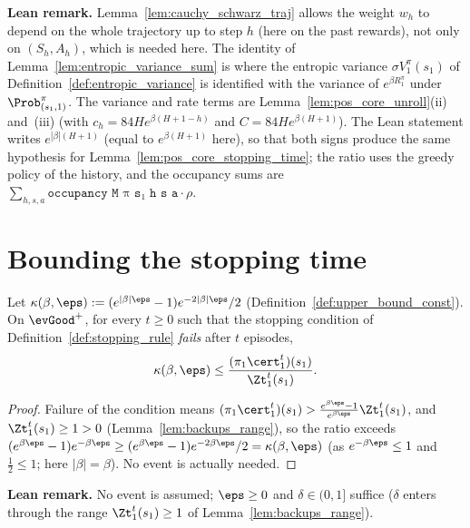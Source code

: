 \textbf{Lean remark.} Lemma~\ref{lem:cauchy_schwarz_traj} allows the weight $w_h$ to depend on
the whole trajectory up to step $h$ (here on the past rewards), not only on $(S_h, A_h)$, which
is needed here. The identity of Lemma~\ref{lem:entropic_variance_sum} is where the entropic
variance $\sigma V^\pi_1(s_1)$ of Definition~\ref{def:entropic_variance} is identified with the
variance of $e^{\beta R_1^\pi}$ under $\Prob^\pi_{(s_1,1)}$. The variance and rate terms are
Lemma~\ref{lem:pos_core_unroll}(ii) and~(iii) (with $c_h = 84He^{\beta(H+1-h)}$ and
$C = 84He^{\beta(H+1)}$). The Lean statement writes $e^{|\beta|(H+1)}$ (equal to $e^{\beta(H+1)}$ here), so
that both signs produce the same hypothesis for Lemma~\ref{lem:pos_core_stopping_time}; the
ratio uses the greedy policy of the history, and the occupancy sums are
$\sum_{h, s, a}\texttt{occupancy M π s₁ h s a} \cdot \rho$.

\section{Bounding the stopping time}
\label{sec:pos_stopping_time}

\begin{lemma}\label{lem:progress_pos}
\leanok
{}
Let $\kappa(\beta, \eps) := (e^{|\beta|\eps} - 1)e^{-2|\beta|\eps}/2$ (Definition~\ref{def:upper_bound_const}).
On $\evGood^+$, for every $t \ge 0$ such that the stopping condition of Definition~\ref{def:stopping_rule}
\emph{fails} after $t$ episodes,
\[
  \kappa(\beta, \eps) \le \frac{(\pi_1\cert_1^t)(s_1)}{\Zt_1^t(s_1)} .
\]
\end{lemma}

\begin{proof}
\leanok
Failure of the condition means $(\pi_1\cert_1^t)(s_1) > \frac{e^{\beta\eps} - 1}{e^{\beta\eps}}\Zt_1^t(s_1)$, and
$\Zt_1^t(s_1) \ge 1 > 0$ (Lemma~\ref{lem:backups_range}), so the ratio exceeds
$(e^{\beta\eps} - 1)e^{-\beta\eps} \ge (e^{\beta\eps} - 1)e^{-2\beta\eps}/2 = \kappa(\beta,\eps)$ (as $e^{-\beta\eps} \le 1$ and $\frac12 \le 1$;
here $|\beta| = \beta$). No event is actually needed.
\end{proof}

\textbf{Lean remark.} No event is assumed; $\eps \ge 0$ and $\delta \in (0, 1]$ suffice ($\delta$ enters
through the range $\Zt_1^t(s_1) \ge 1$ of Lemma~\ref{lem:backups_range}).

